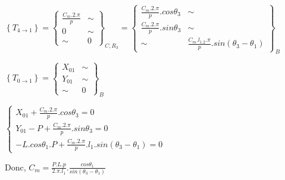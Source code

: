 $\left\{T_{4\rightarrow 1}\right\}=\left\{\begin{array}{cc}
\frac{C_m.2.\pi}{p} & \sim \\
0 & \sim \\
\sim & 0
\end{array}\right\}_{C,R_3}=\left\{\begin{array}{cc}
\frac{C_m.2.\pi}{p}.cos\theta_3 & \sim \\
\frac{C_m.2.\pi}{p}.sin\theta_3 & \sim \\
\sim & \frac{C_m.l_1.2.\pi}{p}.sin(\theta_3-\theta_1)
\end{array}\right\}_B$

$\left\{T_{0\rightarrow 1}\right\}=\left\{\begin{array}{cc}
X_{01} & \sim \\
Y_{01} & \sim \\
\sim & 0
\end{array}\right\}_B$

$\left\{\begin{array}{l}
X_{01}+\frac{C_m.2.\pi}{p}.cos\theta_3=0 \\
Y_{01}-P+\frac{C_m.2.\pi}{p}.sin\theta_3=0 \\
-L.cos\theta_1.P+\frac{C_m.2.\pi}{p}.l_1.sin(\theta_3-\theta_1)=0
\end{array}\right.$

Donc, $C_m=\frac{P.L.p}{2.\pi.l_1}.\frac{cos\theta_1}{sin(\theta_3-\theta_1)}$


